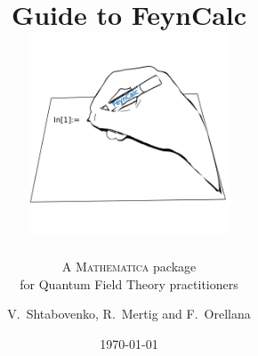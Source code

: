 \documentclass[11pt,a4paper,
parskip=half, %
]{scrreprt}
\author{}
\date{}
\begin{document}
\title{Guide to FeynCalc \\
\centering\includegraphics[width=6cm]{figures/logo.png}}
\subtitle{A \textsc{Mathematica} package \\ for Quantum Field Theory practitioners}
\author{V.~Shtabovenko, R.~Mertig and F.~Orellana}
\date{\today}
\maketitle

{\hypersetup{hidelinks}
\tableofcontents
}	

%
%
%
\end{document}
